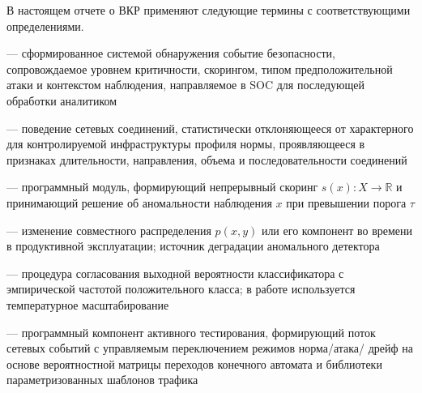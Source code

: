 
В настоящем отчете о ВКР применяют следующие термины с
соответствующими определениями.

\vspace{6pt}

\begin{description}[
    font=\normalfont\bfseries,
    leftmargin=0pt, labelindent=0pt, labelsep=0.4em,
    style=sameline, itemsep=4pt, topsep=0pt
]

\item[Алерт] {\normalfont ---
сформированное системой обнаружения событие безопасности,
сопровождаемое уровнем критичности, скорингом, типом
предположительной атаки и контекстом наблюдения, направляемое в
SOC для последующей обработки аналитиком}

\item[Аномальная сетевая активность] {\normalfont ---
поведение сетевых соединений, статистически отклоняющееся от
характерного для контролируемой инфраструктуры профиля нормы,
проявляющееся в признаках длительности, направления, объема и
последовательности соединений}

\item[Аномальный детектор] {\normalfont ---
программный модуль, формирующий непрерывный скоринг
\(s(x)\colon X \to \mathbb{R}\) и принимающий решение об
аномальности наблюдения \(x\) при превышении порога \(\tau\)}

\item[Дрейф распределений] {\normalfont ---
изменение совместного распределения \(p(x, y)\) или его компонент
во времени в продуктивной эксплуатации; источник деградации
аномального детектора}

\item[Калибровка вероятностей] {\normalfont ---
процедура согласования выходной вероятности классификатора
с эмпирической частотой положительного класса; в работе
используется температурное масштабирование}

\item[Конечно-автоматный агент] {\normalfont ---
программный компонент активного тестирования, формирующий поток
сетевых событий с управляемым переключением режимов норма/атака/
дрейф на основе вероятностной матрицы переходов конечного автомата
и библиотеки параметризованных шаблонов трафика}


\end{description}
